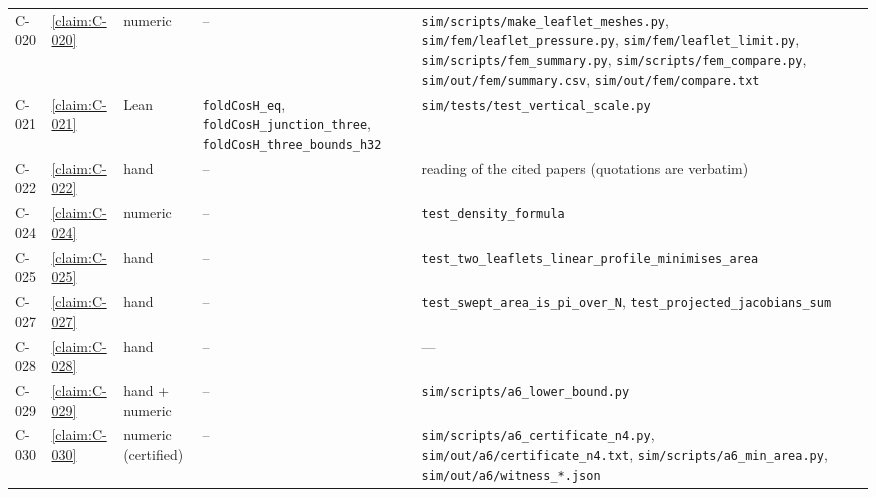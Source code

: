 \begin{longtable}{@{}l>{\raggedright}p{}>{\raggedright}p{}>{\raggedright}p{}>{\raggedright\arraybackslash}p{}@{}}
C-020 & \cref{claim:C-020} & numeric & -- & \texttt{sim/\allowbreak{}scripts/\allowbreak{}make\_\allowbreak{}leaflet\_\allowbreak{}meshes.\allowbreak{}py}, \texttt{sim/\allowbreak{}fem/\allowbreak{}leaflet\_\allowbreak{}pressure.\allowbreak{}py}, \texttt{sim/\allowbreak{}fem/\allowbreak{}leaflet\_\allowbreak{}limit.\allowbreak{}py}, \texttt{sim/\allowbreak{}scripts/\allowbreak{}fem\_\allowbreak{}summary.\allowbreak{}py}, \texttt{sim/\allowbreak{}scripts/\allowbreak{}fem\_\allowbreak{}compare.\allowbreak{}py}, \texttt{sim/\allowbreak{}out/\allowbreak{}fem/\allowbreak{}summary.\allowbreak{}csv}, \texttt{sim/\allowbreak{}out/\allowbreak{}fem/\allowbreak{}compare.\allowbreak{}txt}\\
C-021 & \cref{claim:C-021} & Lean & \texttt{foldCosH\_\allowbreak{}eq}, \texttt{foldCosH\_\allowbreak{}junction\_\allowbreak{}three}, \texttt{foldCosH\_\allowbreak{}three\_\allowbreak{}bounds\_\allowbreak{}h32} & \texttt{sim/\allowbreak{}tests/\allowbreak{}test\_\allowbreak{}vertical\_\allowbreak{}scale.\allowbreak{}py}\\
C-022 & \cref{claim:C-022} & hand & -- & reading of the cited papers (quotations are verbatim)\\
C-024 & \cref{claim:C-024} & numeric & -- & \texttt{test\_\allowbreak{}density\_\allowbreak{}formula}\\
C-025 & \cref{claim:C-025} & hand & -- & \texttt{test\_\allowbreak{}two\_\allowbreak{}leaflets\_\allowbreak{}linear\_\allowbreak{}profile\_\allowbreak{}minimises\_\allowbreak{}area}\\
C-027 & \cref{claim:C-027} & hand & -- & \texttt{test\_\allowbreak{}swept\_\allowbreak{}area\_\allowbreak{}is\_\allowbreak{}pi\_\allowbreak{}over\_\allowbreak{}N}, \texttt{test\_\allowbreak{}projected\_\allowbreak{}jacobians\_\allowbreak{}sum}\\
C-028 & \cref{claim:C-028} & hand & -- & —\\
C-029 & \cref{claim:C-029} & hand + numeric & -- & \texttt{sim/\allowbreak{}scripts/\allowbreak{}a6\_\allowbreak{}lower\_\allowbreak{}bound.\allowbreak{}py}\\
C-030 & \cref{claim:C-030} & numeric (certified) & -- & \texttt{sim/\allowbreak{}scripts/\allowbreak{}a6\_\allowbreak{}certificate\_\allowbreak{}n4.\allowbreak{}py}, \texttt{sim/\allowbreak{}out/\allowbreak{}a6/\allowbreak{}certificate\_\allowbreak{}n4.\allowbreak{}txt}, \texttt{sim/\allowbreak{}scripts/\allowbreak{}a6\_\allowbreak{}min\_\allowbreak{}area.\allowbreak{}py}, \texttt{sim/\allowbreak{}out/\allowbreak{}a6/\allowbreak{}witness\_\allowbreak{}*.\allowbreak{}json}\\

\end{longtable}
